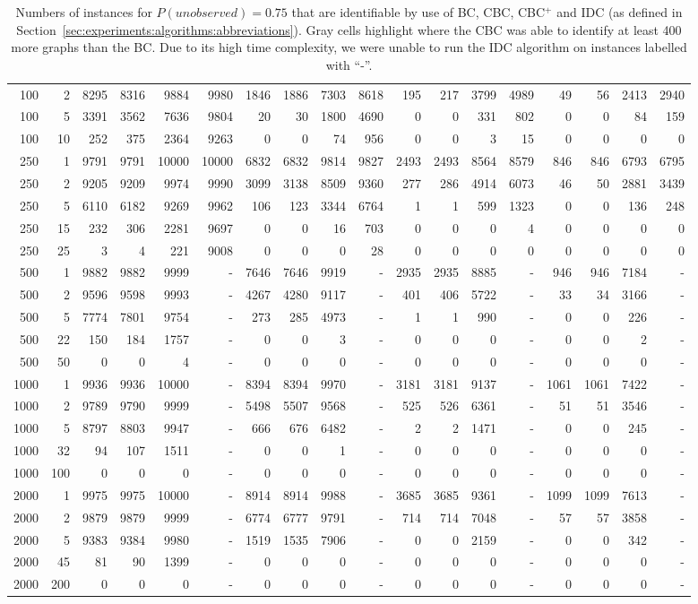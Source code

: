 {\begin{table}
\begin{center}
\begin{tabular}{|rr | rrrr| rrrr| rrrr| rrrr|}
100&2&
8295&8316&9884&9980&1846&1886&7303&8618&195&217&3799&4989&49&56&2413&2940\\
100&5&
3391&3562&7636&9804&20&30&1800&4690&0&0&331&802&0&0&84&159\\
100&10&
252&375&2364&9263&0&0&74&956&0&0&3&15&0&0&0&0\\
\hline
250&1&
9791&9791&10000&10000&6832&6832&9814&9827&2493&2493&8564&8579&846&846&6793&6795\\
250&2&
9205&9209&9974&9990&3099&3138&8509&9360&277&286&4914&6073&46&50&2881&3439\\
250&5&
6110&6182&9269&9962&106&123&3344&6764&1&1&599&1323&0&0&136&248\\
250&15&
232&306&2281&9697&       0&0&16&703&        0&0&0&4&          0&0&0&0\\
250&25&
3&4&221&9008&0&0&0&28&0&0&0&0&0&0&0&0\\
\hline
500&1&
9882&9882&9999&-&7646&7646&9919&-&2935&2935&8885&-&946&946&7184&-\\
500&2&
9596&9598&9993&-&4267&4280&9117&-&401&406&5722&-&33&34&3166&-\\
500&5&
7774&7801&9754&-&273&285&4973&-&1&1&990&-&0&0&226&-\\
500&22&
150&184&1757&-&0&0&3&-&0&0&0&-&0&0&2&-\\
500&50&
0&0&4&-&0&0&0&-&0&0&0&-&0&0&0&-\\
\hline
1000&1&
9936&9936&10000&-&8394&8394&9970&-&3181&3181&9137&-&1061&1061&7422&-\\
1000&2&
9789&9790&9999&-&5498&5507&9568&-&525&526&6361&-&51&51&3546&-\\
1000&5&
8797&8803&9947&-&666&676&6482&-&2&2&1471&-&0&0&245&-\\
1000&32&
94&107&1511&-&0&0&1&-&0&0&0&-&0&0&0&-\\
1000&100&
0&0&0&-&0&0&0&-&0&0&0&-&0&0&0&-\\
\hline
2000&1&
9975&9975&10000&-&8914&8914&9988&-&3685&3685&9361&-&1099&1099&7613&-\\
2000&2&
9879&9879&9999&-&6774&6777&9791&-&714&714&7048&-&57&57&3858&-\\
2000&5&
9383&9384&9980&-&1519&1535&7906&-&0&0&2159&-&0&0&342&-\\
2000&45&
81&90&1399&-&0&0&0&-&0&0&0&-&0&0&0&-\\
2000&200&
0&0&0&-&0&0&0&-&0&0&0&-&0&0&0&-\\
\hline\end{tabular}
  \end{center}\vspace*{-3mm}
  \caption{Numbers of instances for $P(\textit{unobserved}) = 0.75$ that are identifiable 
    by use of BC, CBC, CBC$^+$ and IDC (as defined in Section~\ref{sec:experiments:algorithms:abbreviations}).
    Gray cells highlight where the CBC was able to identify at least 400 more graphs than the BC.
    Due to its high time complexity, we were unable to run the IDC algorithm on instances labelled
	with ``-''.}\label{table:global:stat:unobs0.75:count}
  \end{table}

}
